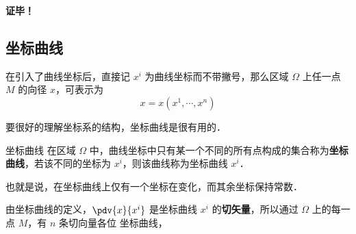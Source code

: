 \textbf{证毕！}
\subsection{坐标曲线}
在引入了曲线坐标后，直接记 $x^i$ 为曲线坐标而不带撇号，那么区域 $\Omega$ 上任一点 $M$ 的向径 $x$，可表示为
\begin{equation}
x=x(x^1,\cdots,x^n)
\end{equation}

要很好的理解坐标系的结构，坐标曲线是很有用的．
\begin{definition}{坐标曲线}
在区域 $\Omega$ 中，曲线坐标中只有某一个不同的所有点构成的集合称为\textbf{坐标曲线}，若该不同的坐标为 $x^i$，则该曲线称为坐标曲线 $x^i$．
\end{definition}
也就是说，在坐标曲线上仅有一个坐标在变化，而其余坐标保持常数．

由坐标曲线的定义，$\pdv{x}{x^i}$ 是坐标曲线 $x^i$ 的\textbf{切矢量}，所以通过 $\Omega$ 上的每一点 $M$，有 $n$ 条切向量各位 $$坐标曲线，